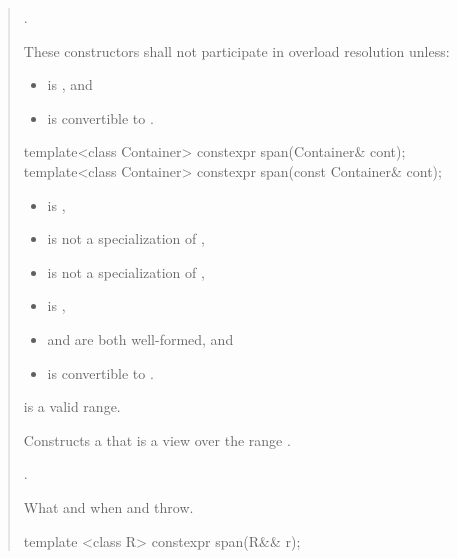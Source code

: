 \documentclass{wg21}
\begin{document}
\begin{quote}
\begin{itemdescr}
    \pnum
    \ensures
    .

    \pnum
    \remarks
    These constructors shall not participate in overload resolution unless:
    \begin{itemize}
        \item {} is , and
        \item {} is convertible to .
    \end{itemize}
\end{itemdescr}

\begin{removedblock}
\begin{itemdecl}
template<class Container> constexpr span(Container& cont);
template<class Container> constexpr span(const Container& cont);
\end{itemdecl}

\begin{itemdescr}
\pnum
\constraints
\begin{itemize}
	\item {} is ,
	\item {} is not a specialization of ,
	\item {} is not a specialization of ,
	\item {} is ,
	\item {} and  are both well-formed, and
	\item {} is convertible to .
\end{itemize}

\pnum
\expects
{} is a valid range.

\pnum
\effects
Constructs a  that is a view over the range .

\pnum
\ensures
{}.

\pnum
\throws
What and when  and  throw.
\end{itemdescr}
\end{removedblock}


\begin{addedblock}
\begin{itemdecl}
template <class R>
constexpr span(R&& r);
\end{itemdecl}
\end{addedblock}


\end{quote}
\end{document}
